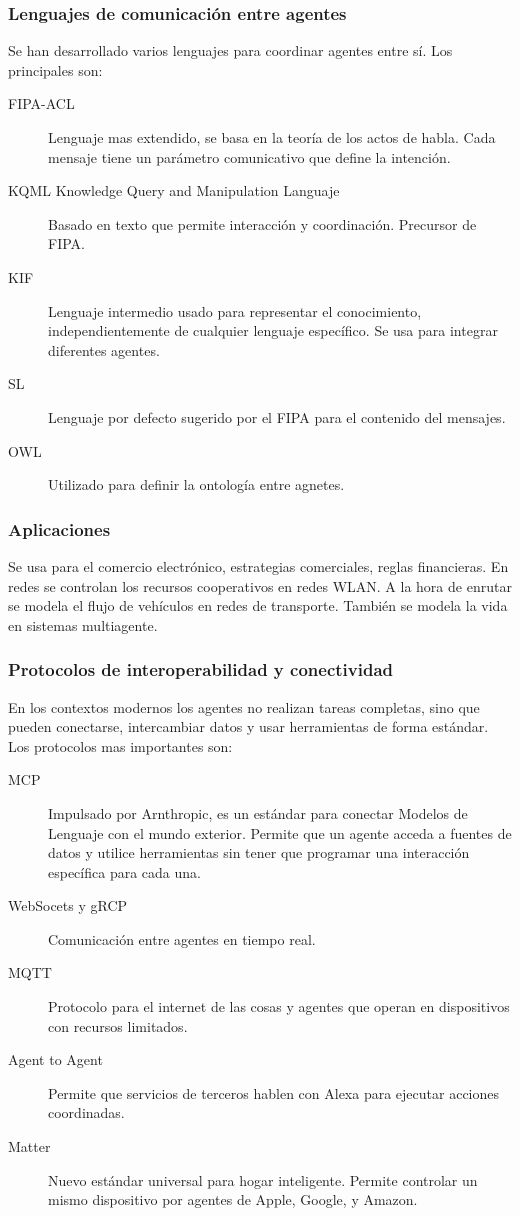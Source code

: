     \subsubsection{Lenguajes de comunicación entre agentes}
        Se han desarrollado varios lenguajes para coordinar agentes entre sí. Los principales son:
        \begin{description}
            \item[FIPA-ACL]Lenguaje mas extendido, se basa en la teoría de los actos de habla. Cada mensaje tiene un parámetro comunicativo que define la intención.
            \item[KQML Knowledge Query and Manipulation Languaje] Basado en texto que permite interacción y coordinación. Precursor de FIPA.
            \item[KIF] Lenguaje intermedio usado para representar el conocimiento, independientemente de cualquier lenguaje específico. Se usa para integrar diferentes agentes.
            \item[SL] Lenguaje por defecto sugerido por el FIPA para el contenido del mensajes.
            \item[OWL] Utilizado para definir la ontología entre agnetes.
        \end{description}

    \subsubsection{Aplicaciones}
        Se usa para el comercio electrónico, estrategias comerciales, reglas financieras. En redes se controlan los recursos cooperativos en redes WLAN. A la hora de enrutar se modela el flujo de vehículos en redes de transporte. También se modela la vida en sistemas multiagente.

    \subsubsection{Protocolos de interoperabilidad y conectividad}
        En los contextos modernos los agentes no realizan tareas completas, sino que pueden conectarse, intercambiar datos y usar herramientas de forma estándar. Los protocolos mas importantes son:
        \begin{description}
            \item[MCP] Impulsado por Arnthropic, es un estándar para conectar Modelos de Lenguaje con el mundo exterior. Permite que un agente acceda a fuentes de datos y utilice herramientas sin tener que programar una interacción específica para cada una.
            \item[WebSocets y gRCP] Comunicación entre agentes en tiempo real.
            \item[MQTT] Protocolo para el internet de las cosas y agentes que operan en dispositivos con recursos limitados.
            \item[Agent to Agent] Permite que servicios de terceros hablen con Alexa para ejecutar acciones coordinadas.
            \item[Matter] Nuevo estándar universal para hogar inteligente. Permite controlar un mismo dispositivo por agentes de Apple, Google, y Amazon.
        \end{description}

